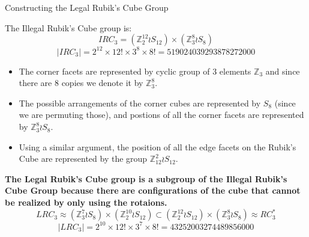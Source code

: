\documentclass[final]{beamer}
\newlength{\colwidth}
\begin{document}
\begin{frame}[t]
\begin{columns}[t]
\begin{column}{\colwidth}
\begin{block}{Constructing the Legal Rubik's Cube Group}
    
    The Illegal Rubik's Cube group is:
    $$IRC_{3} = (\mathbb{Z}^{12}_2 \wr S_{12}) \times (\mathbb{Z}^8_3 \wr S_8)$$
    $$|IRC_{3}| = 2^{12} \times 12! \times 3^8 \times 8! = 519024039293878272000$$
    
\begin{itemize} 
\item The corner facets are represented by cyclic group of 3 elements $\mathbb{Z}_{3}$ and since there are $8$ copies we denote it by $\mathbb{Z}_3 ^8$.
\item The possible arrangements of the corner cubes are represented by $S_{8}$ (since we are permuting those), and postions of all the corner facets are represented by $\mathbb{Z}_{3}^{8} \wr S_{8}$.
\item Using a similar argument, the position of all the edge facets on the Rubik's Cube are represented by the group $\mathbb{Z}_{12}^{2} \wr S_{12}$.
\end{itemize} 

    \textbf{The Legal Rubik's Cube group is a subgroup of the Illegal Rubik's Cube Group because there are configurations of the cube that cannot be realized by only using the rotaions.}
$$LRC_{3} \approx (\mathbb{Z}_{3}^{7} \wr S_{8}) \times (\mathbb{Z}_{2}^{10} \wr S_{12}) \subset  (\mathbb{Z}^{12}_2 \wr S_{12}) \times (\mathbb{Z}^8_3 \wr S_8) \approx RC^{*}_{3}$$
$$ |LRC_{3}| = 2^{10} \times 12! \times 3^7 \times 8! = 43252003274489856000$$


    




    





\end{block}
\end{column}
\end{columns}
\end{frame}
\end{document}
